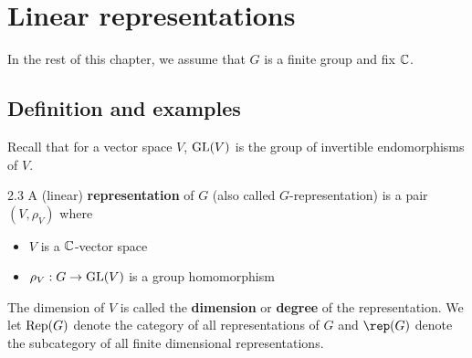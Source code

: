 \documentclass[twoside = false,	%
		headsepline,		%
		parskip = true,
		]{scrbook}						%
\begin{document}
\section{Linear representations}
    In the rest of this chapter, we assume that $G$ is a finite group and fix $\mathbb C$.
    
    \subsection{Definition and examples}
        Recall that for a vector space $V$, $\mathrm{GL}(V)$ is the group of invertible endomorphisms of $V$.
        \begin{definition}{}{2.3}
            A (linear) \textbf{representation} of $G$ (also called $G$-representation) is a pair $(V,\rho_V)$ where
            \begin{itemize}
                \item $V$ is a $\mathbb C$-vector space
                \item $\rho_V: G \to \mathrm{GL}(V)$ is a group homomorphism
            \end{itemize}
            
            The dimension of $V$ is called the \textbf{dimension} or \textbf{degree} of the representation. We let $\mathrm{Rep}(G)$ denote the category of all representations of $G$ and $\rep(G)$ denote the subcategory of all finite dimensional representations.
        \end{definition}
        
\end{document}
